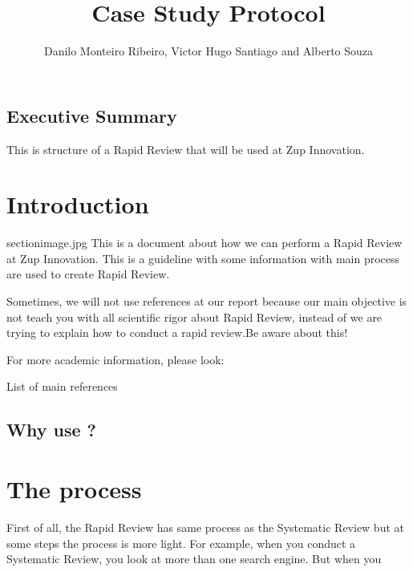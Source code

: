 \documentclass{TheMartianReport}
\title{Case Study Protocol} %
\author{Danilo Monteiro Ribeiro, Victor Hugo Santiago and Alberto Souza } %
\begin{document}

\subsection{Executive Summary}
This is structure of a Rapid Review that will be used at Zup Innovation. 

\section{Introduction}{sectionimage.jpg}
This is a document about how we can perform a Rapid Review at Zup Innovation. This is a guideline with some information with main process are used to create Rapid Review.


Sometimes, we will not use references at our report because our main objective is not teach you with all scientific rigor about Rapid Review, instead of we are trying to explain how to conduct a rapid review.Be aware about this!

 For more academic information, please look:
 
\begin{nicelist}{List of main references }
\item \cite{cartaxo2018model}
\item \cite{cartaxo2018role}
\item \cite{cartaxo2020rapid}
\end{nicelist}


\subsection{Why use ?}





\section{ The process}

First of all, the Rapid Review has same process as the Systematic Review but at some steps the process is more light. For example, when you conduct a Systematic Review, you look at more than one search engine. But when you 



\lipsum[50]
\lipsum[100]
\lipsum
\end{document}
